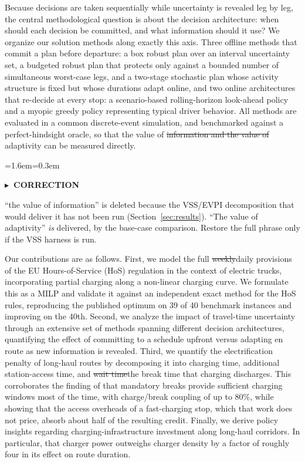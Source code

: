 \documentclass[preprint,12pt,3p]{elsarticle}
\newcommand{\FIX}[1]{{\color{annred}#1}}
\newcommand{\DEL}[1]{{\color{anngray}\sout{#1}}}
\newenvironment{ann}[2]{%
  \par\addvspace{4pt}%
  \begin{list}{}{\leftmargin=1.6em\rightmargin=0.3em\topsep=0pt\parsep=3pt\itemsep=0pt\listparindent=0pt}%
  \item[]\color{#1}\small\textbf{\textsf{#2}}\par\nopagebreak\vspace{1pt}\color{#1}\small\ignorespaces}
  {\end{list}\addvspace{4pt}}
\newenvironment{afix}{\begin{ann}{annred}{$\blacktriangleright$\ CORRECTION}}{\end{ann}}
\begin{document}
Because decisions are taken sequentially while uncertainty is revealed leg by leg, the central methodological question is about the decision architecture: when should each decision be committed, and what information should it use? We organize our solution methods along exactly this axis. Three offline methods that commit a plan before departure: a box robust plan over an interval uncertainty set, a budgeted robust plan that protects only against a bounded number of simultaneous worst-case legs, and a two-stage stochastic plan whose activity structure is fixed but whose durations adapt online, and two online architectures that re-decide at every stop: a scenario-based rolling-horizon look-ahead policy and a myopic greedy policy representing typical driver behavior. All methods are evaluated in a common discrete-event simulation, and benchmarked against a perfect-hindsight oracle, so that the value of \DEL{information and the value of} adaptivity can be measured directly.

\begin{afix}
``the value of information'' is deleted because the VSS/EVPI decomposition that
would deliver it has not been run (Section~\ref{sec:results}). ``The value of
adaptivity'' \emph{is} delivered, by the base-case comparison. Restore the full
phrase only if the VSS harness is run.
\end{afix}

Our contributions are as follows.
First, we model the full \DEL{weekly}\FIX{daily} provisions of the EU Hours-of-Service (HoS) regulation in the context of electric trucks, incorporating partial charging along a non-linear charging curve. We formulate this as a MILP and validate it against an independent exact method for the HoS rules\FIX{, reproducing the published optimum on 39 of 40 benchmark instances and improving on the 40th}.
Second, we analyze the impact of travel-time uncertainty through an extensive set of methods spanning different decision architectures, quantifying the effect of committing to a schedule upfront versus adapting en route as new information is revealed.
Third, we quantify the electrification penalty of long-haul routes by decomposing it into charging time, additional station-access time, and \DEL{wait time}\FIX{the break time that charging discharges}. This corroborates the finding of \citet{brockmann_break-and-charge_2025} that mandatory breaks provide sufficient charging windows most of the time, with charge/break coupling of up to 80\%\FIX{, while showing that the access overheads of a fast-charging stop, which that work does not price, absorb about half of the resulting credit}.
Finally, we derive policy insights regarding charging-infrastructure investment along long-haul corridors. In particular, that charger power outweighs charger density by a factor of roughly four in its effect on route duration.
\end{document}
